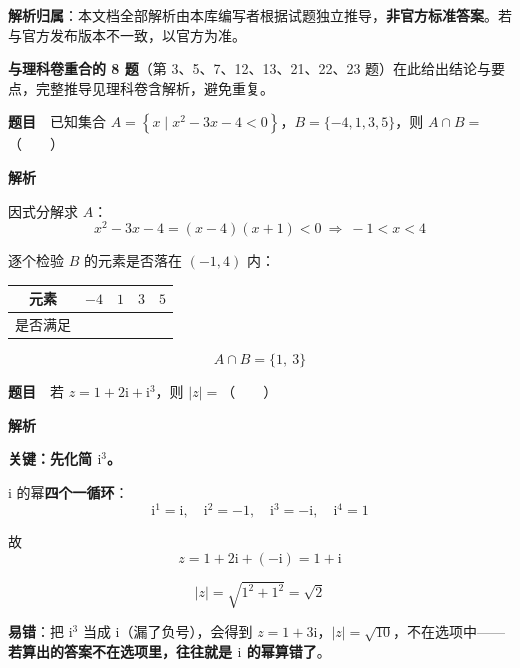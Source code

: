 

\begin{gknotice}
\textbf{解析归属}：本文档全部解析由本库编写者根据试题独立推导，\textbf{非官方标准答案}。若与官方发布版本不一致，以官方为准。

\textbf{与理科卷重合的 8 题}（第 3、5、7、12、13、21、22、23 题）在此给出结论与要点，完整推导见理科卷含解析，避免重复。
\end{gknotice}

\par\medskip



\textbf{题目}　已知集合 $A=\left\{x\mid x^{2}-3x-4<0\right\}$，$B=\{-4,1,3,5\}$，则 $A\cap B=$（　　）

\textbf{解析}

因式分解求 $A$：
\[x^{2}-3x-4=(x-4)(x+1)<0\ \Longrightarrow\ -1<x<4\]

逐个检验 $B$ 的元素是否落在 $(-1,4)$ 内：

\begin{center}
\begin{tabular}{ccccc}
\toprule
元素 & $-4$ & $1$ & $3$ & $5$ \\
\midrule
是否满足 &  &  &  &  \\
\bottomrule
\end{tabular}
\end{center}

\[A\cap B=\{1,\ 3\}\]


\par\medskip


\textbf{题目}　若 $z=1+2\mathrm i+\mathrm i^{3}$，则 $|z|=$（　　）

\textbf{解析}

\textbf{关键：先化简 $\mathrm i^{3}$。}

$\mathrm i$ 的幂\textbf{四个一循环}：
\[\mathrm i^{1}=\mathrm i,\quad \mathrm i^{2}=-1,\quad \mathrm i^{3}=-\mathrm i,\quad \mathrm i^{4}=1\]

故
\[z=1+2\mathrm i+(-\mathrm i)=1+\mathrm i\]

\[|z|=\sqrt{1^{2}+1^{2}}=\sqrt2\]


\begin{gktip}
\textbf{易错}：把 $\mathrm i^{3}$ 当成 $\mathrm i$（漏了负号），会得到 $z=1+3\mathrm i$，$|z|=\sqrt{10}$，不在选项中——\textbf{若算出的答案不在选项里，往往就是 $\mathrm i$ 的幂算错了}。
\end{gktip}

